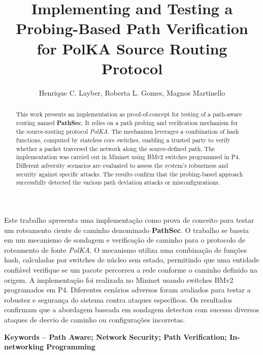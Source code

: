 \documentclass[12pt]{article}
\title{Implementing and Testing a Probing-Based Path Verification for PolKA Source Routing Protocol}
\author{Henrique C. Layber, Roberta L. Gomes, Magnos Martinello}
\newcommand{\pathsec}{\textbf{PathSec}\xspace}
\newcommand{\polka}{\textit{PolKA}\xspace}
\begin{document}
 

\maketitle

\begin{abstract}
    This work presents an implementation as proof-of-concept  for testing of a path-aware routing named \pathsec. It relies on a path probing and verification mechanism for the source-routing protocol \polka. The mechanism leverages a combination of hash functions, computed by stateless core switches, enabling a trusted party to verify whether a packet traversed the network along the source-defined path. The implementation was carried out in Mininet using BMv2 switches programmed in P4. Different adversity scenarios are evaluated to assess the system's robustness and security against specific attacks. The results confirm that the probing-based approach successfully detected the various path deviation attacks or misconfigurations.

    
\end{abstract}
     
\begin{resumo} 
Este trabalho apresenta uma implementação como prova de conceito para testar um roteamento ciente de caminho denominado \pathsec. O trabalho se baseia em um mecanismo de sondagem e verificação de caminho para o protocolo de roteamento de fonte \polka. O mecanismo utiliza uma combinação de funções hash, calculadas por switches de núcleo sem estado, permitindo que uma entidade confiável verifique se um pacote percorreu a rede conforme o caminho definido na origem. A implementação foi realizada no Mininet usando switches BMv2 programados em P4. Diferentes cenários adversos foram avaliados para testar a robustez e segurança do sistema contra ataques específicos. Os resultados confirmam que a abordagem baseada em sondagem detectou com sucesso diversos ataques de desvio de caminho ou configurações incorretas.
\end{resumo}

{\footnotesize\textbf{Keywords -- Path Aware; Network Security; Path Verification; In-networking Programming}}











\end{document}
